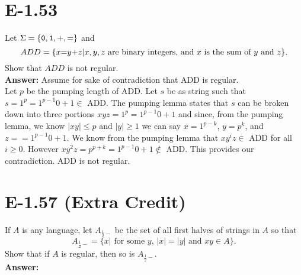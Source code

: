 \documentclass{article}
\begin{document}
\section*{E-1.53}

Let $\Sigma = \{{\tt 0},{\tt 1},{\tt +},{\tt =}\}$ and
$$ ADD = \{x{\tt =}y{\tt +}z | x,y,z \mbox{\ are binary integers, and $x$ is the sum of $y$ and $z$}\}.$$
Show that $ADD$ is not regular.\\
{\bf Answer: } Assume for sake of contradiction that ADD is regular. \\
Let $p$ be the pumping length of ADD. Let $s$ be as string such that $s= 1^p = 1^{p-1}0 +1 \in $ ADD. The pumping lemma states that $s$ can be broken down into three portions $xyz = 1^p = 1^{p-1}0 +1$ and since, from the pumping lemma, we know $|xy| \leq p$ and $|y| \geq 1$ we can say $x = 1^{p-k}$, $y=p^k$, and $z=  =1^{p-1}0 +1$. We know from the pumping lemma that $xy^iz \in $ ADD for all $i \geq 0$. However $xy^2z = p^{p+k} = 1^{p-1}0 +1 \notin$ ADD. This provides our contradiction. ADD is not regular.


\section*{E-1.57 (Extra Credit)}

\newcommand{\AH}{\ensuremath{A_{\frac{1}{2}-}}}

If $A$ is any language, let $\AH$ be the set of all first halves
of strings in $A$ so that
$$ \AH = \{x | \mbox{\ for some $y$, $|x| = |y|$ and $xy \in A$}\}. $$
Show that if $A$ is regular, then so is $\AH$.\\
{\bf Answer: } %
\end{document}
